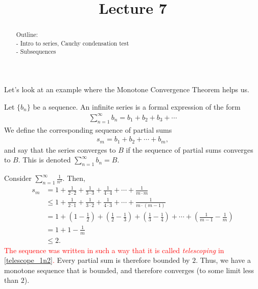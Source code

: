 \documentclass{ximera}
\begin{document}
    \title{Lecture 7}
    
    \begin{abstract}  
    Outline: \\
    - Intro to series, Cauchy condensation test \\
    - Subsequences
\end{abstract}

\maketitle

Let's look at an example where the Monotone Convergence Theorem helps us.

\begin{definition}
    Let $\{b_n\}$ be a sequence.  An infinite series is a formal expression of the form
    \begin{align}
        \sum\limits_{n=1}^\infty b_n = b_1 + b_2 + b_3 + \cdots
    \end{align}
    We define the corresponding sequence of partial sums 
    \begin{align*}
        s_m = b_1 + b_2 + \cdots + b_m,
    \end{align*}
    and say that the series converges to $B$ if the sequence of partial sums converges to $B$.  This is denoted $\sum\limits_{n=1}^\infty b_n = B$.
\end{definition}

\begin{example}
    Consider $\sum\limits_{n=1}^\infty \frac{1}{n^2}$.  Then,
    \begin{align}
        s_m &= 1 + \frac1{2\cdot 2} + \frac1{3\cdot3} + \frac1{4\cdot4} + \cdots + \frac1{m\cdot m}
        \\
        &\leq
        1 + \frac1{2\cdot 1} + \frac1{3\cdot2} + \frac1{4\cdot3} + \cdots + \frac1{m\cdot (m-1)}
        \\ \label{telescope_1n2}
        &=
        1 + \left(1-\frac12\right) + \left(\frac12 - \frac13 \right) + \left( \frac13-\frac14\right) + \cdots + \left(\frac{1}{m-1}-\frac{1}{m}\right)
        \\
        &= 1 + 1 - \frac{1}m\\
        &\leq 2.
    \end{align}
    \textcolor{red}{The sequence was written in such a way that it is called \textit{telescoping} in \eqref{telescope_1n2}.}
    Every partial sum is therefore bounded by $2$.  Thus, we have a monotone sequence that is bounded, and therefore converges (to some limit less than $2$).
\end{example}
\end{document}
